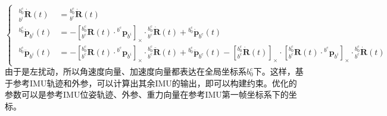 \documentclass[12pt, onecolumn]{article}
\newcommand\liehat[1]{\left[ #1 \right]_\times}
\begin{document}
	\begin{equation}
	\begin{cases}
	\begin{aligned}
	{^{b^c_0}_{b^i}\dot{\boldsymbol{R}}(t)}&={^{b^c_0}_{b^c}\dot{\boldsymbol{R}}(t)}\\
	{^{b^c_0}\dot{\boldsymbol{p}}_{b^i}(t)}&=
	-\liehat{{^{b^c_0}_{b^c}\boldsymbol{R}(t)}\cdot{^{b^c}\boldsymbol{p}_{b^i}}}\cdot{^{b^c_0}_{b^c}\dot{\boldsymbol{R}}(t)}
	+{^{b^c_0}\dot{\boldsymbol{p}}_{b^c}(t)}
	\\
	{^{b^c_0}\ddot{\boldsymbol{p}}_{b^i}(t)}&=
	-\liehat{{^{b^c_0}_{b^c}\boldsymbol{R}(t)}\cdot{^{b^c}\boldsymbol{p}_{b^i}}}\cdot
	{^{b^c_0}_{b^c}\ddot{\boldsymbol{R}}(t)}+{^{b^c_0}\ddot{\boldsymbol{p}}_{b^c}(t)}
	-\liehat{{^{b^c_0}_{b^c}\dot{\boldsymbol{R}}(t)}}\cdot
	\liehat{{^{b^c_0}_{b^c}\boldsymbol{R}(t)}\cdot{^{b^c}\boldsymbol{p}_{b^i}}}\cdot{^{b^c_0}_{b^c}\dot{\boldsymbol{R}}(t)}
	\end{aligned}
	\end{cases}
	\end{equation}
	由于是左扰动，所以角速度向量、加速度向量都表达在全局坐标系$b^c_0$下。这样，基于参考IMU轨迹和外参，可以计算出其余IMU的输出，即可以构建约束。优化的参数可以是参考IMU位姿轨迹、外参、重力向量在参考IMU第一帧坐标系下的坐标。
	
\end{document}
